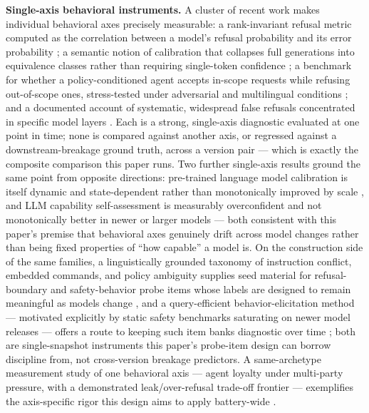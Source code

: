\documentclass[11pt]{article}
\begin{document}
\textbf{Single-axis behavioral instruments.} A cluster of recent work makes individual behavioral axes precisely measurable: a rank-invariant refusal metric computed as the correlation between a model's refusal probability and its error probability \citep{RefusalIndex2607}; a semantic notion of calibration that collapses full generations into equivalence classes rather than requiring single-token confidence \citep{BCalibration2607}; a benchmark for whether a policy-conditioned agent accepts in-scope requests while refusing out-of-scope ones, stress-tested under adversarial and multilingual conditions \citep{OffTopicEval2607}; and a documented account of systematic, widespread false refusals concentrated in specific model layers \citep{ProSafePrune2607}. Each is a strong, single-axis diagnostic evaluated at one point in time; none is compared against another axis, or regressed against a downstream-breakage ground truth, across a version pair --- which is exactly the composite comparison this paper runs. Two further single-axis results ground the same point from opposite directions: pre-trained language model calibration is itself dynamic and state-dependent rather than monotonically improved by scale \citep{PLMCalib9999}, and LLM capability self-assessment is measurably overconfident and not monotonically better in newer or larger models \citep{CapableOf4661} --- both consistent with this paper's premise that behavioral axes genuinely drift across model changes rather than being fixed properties of ``how capable'' a model is. On the construction side of the same families, a linguistically grounded taxonomy of instruction conflict, embedded commands, and policy ambiguity supplies seed material for refusal-boundary and safety-behavior probe items whose labels are designed to remain meaningful as models change \citep{AdversarialPragmatics1153}, and a query-efficient behavior-elicitation method --- motivated explicitly by static safety benchmarks saturating on newer model releases --- offers a route to keeping such item banks diagnostic over time \citep{ElicitBehaviorsMultiTurn3701}; both are single-snapshot instruments this paper's probe-item design can borrow discipline from, not cross-version breakage predictors. A same-archetype measurement study of one behavioral axis --- agent loyalty under multi-party pressure, with a demonstrated leak/over-refusal trade-off frontier --- exemplifies the axis-specific rigor this design aims to apply battery-wide \citep{PrincipalLoyalty0383}.
\end{document}
